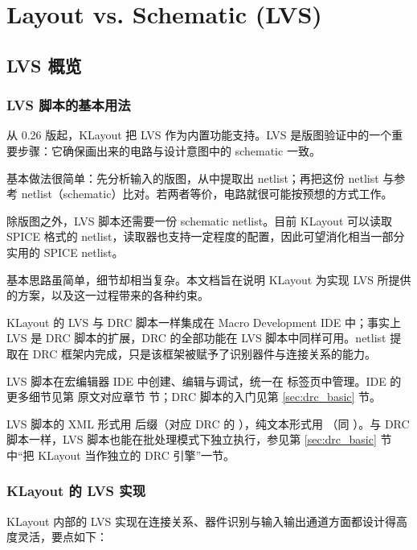 \chapter{Layout vs. Schematic (LVS)}\label{ch:lvs}

\section{LVS 概览}\label{sec:lvs_overview}

\subsection{LVS 脚本的基本用法}

从 0.26 版起，KLayout 把 LVS 作为内置功能支持。LVS 是版图验证中的一个重要步骤：它确保画出来的电路与设计意图中的 schematic 一致。

基本做法很简单：先分析输入的版图，从中提取出 netlist；再把这份 netlist 与参考 netlist（schematic）比对。若两者等价，电路就很可能按预想的方式工作。

除版图之外，LVS 脚本还需要一份 schematic netlist。目前 KLayout 可以读取 SPICE 格式的 netlist，读取器也支持一定程度的配置，因此可望消化相当一部分实用的 SPICE netlist。

基本思路虽简单，细节却相当复杂。本文档旨在说明 KLayout 为实现 LVS 所提供的方案，以及这一过程带来的各种约束。

KLayout 的 LVS 与 DRC 脚本一样集成在 Macro Development IDE 中；事实上 LVS 是 DRC 脚本的扩展，DRC 的全部功能在 LVS 脚本中同样可用。netlist 提取在 DRC 框架内完成，只是该框架被赋予了识别器件与连接关系的能力。

LVS 脚本在宏编辑器 IDE 中创建、编辑与调试，统一在  标签页中管理。IDE 的更多细节见第 原文对应章节 节；DRC 脚本的入门见第 \ref{sec:drc_basic} 节。

LVS 脚本的 XML 形式用  后缀（对应 DRC 的 ），纯文本形式用 （同 ）。与 DRC 脚本一样，LVS 脚本也能在批处理模式下独立执行，参见第 \ref{sec:drc_basic} 节中“把 KLayout 当作独立的 DRC 引擎”一节。

\subsection{KLayout 的 LVS 实现}

KLayout 内部的 LVS 实现在连接关系、器件识别与输入输出通道方面都设计得高度灵活，要点如下：

